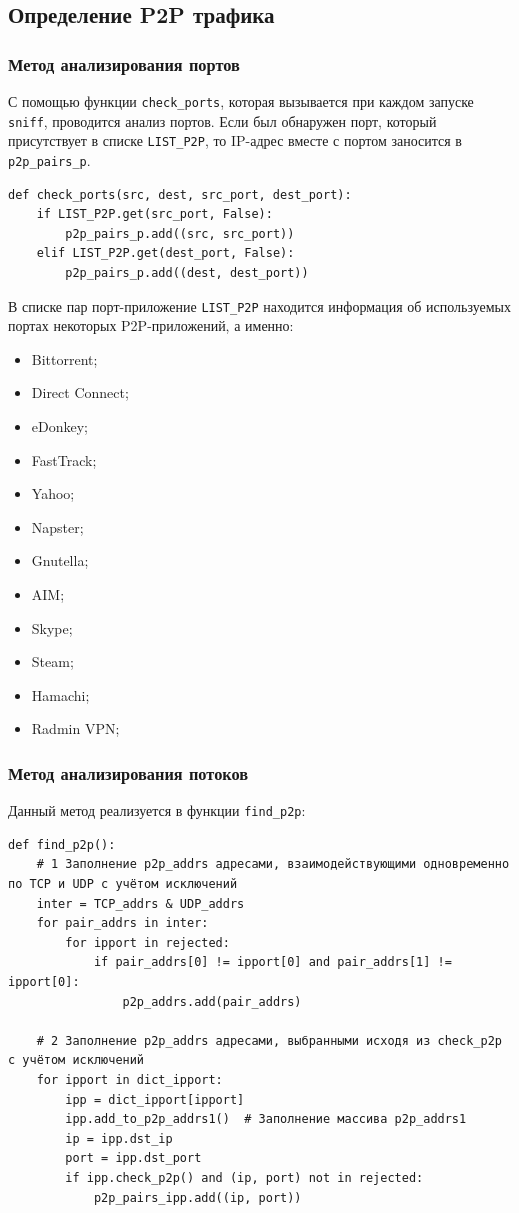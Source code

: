 \documentclass[bachelor, och, coursework]{SCWorks}
\begin{document}
\subsection{Определение P2P трафика}
\subsubsection{Метод анализирования портов}
С помощью функции \texttt{check_ports}, которая вызывается при каждом запуске \texttt{sniff}, проводится анализ портов. 
Если был обнаружен порт, который присутствует в списке \texttt{LIST_P2P}, то IP-адрес вместе с портом заносится в \texttt{p2p_pairs_p}.

\begin{verbatim}
def check_ports(src, dest, src_port, dest_port):
    if LIST_P2P.get(src_port, False):
        p2p_pairs_p.add((src, src_port))
    elif LIST_P2P.get(dest_port, False):
        p2p_pairs_p.add((dest, dest_port))
\end{verbatim}

В списке пар порт-приложение \texttt{LIST_P2P} находится информация об используемых портах некоторых P2P-приложений, а именно:

\begin{itemize}
    \item Bittorrent;
    \item Direct Connect;
    \item eDonkey;
    \item FastTrack;
    \item Yahoo;
    \item Napster;
    \item Gnutella;
    \item AIM;
    \item Skype;
    \item Steam;
    \item Hamachi;
    \item Radmin VPN;
\end{itemize}

\subsubsection{Метод анализирования потоков}
Данный метод реализуется в функции \texttt{find_p2p}:

\begin{verbatim}
def find_p2p():
    # 1 Заполнение p2p_addrs адресами, взаимодействующими одновременно по TCP и UDP с учётом исключений
    inter = TCP_addrs & UDP_addrs
    for pair_addrs in inter:
        for ipport in rejected:
            if pair_addrs[0] != ipport[0] and pair_addrs[1] != ipport[0]:
                p2p_addrs.add(pair_addrs)

    # 2 Заполнение p2p_addrs адресами, выбранными исходя из check_p2p с учётом исключений
    for ipport in dict_ipport:
        ipp = dict_ipport[ipport]
        ipp.add_to_p2p_addrs1()  # Заполнение массива p2p_addrs1
        ip = ipp.dst_ip
        port = ipp.dst_port
        if ipp.check_p2p() and (ip, port) not in rejected:
            p2p_pairs_ipp.add((ip, port))
\end{verbatim}
\end{document}

